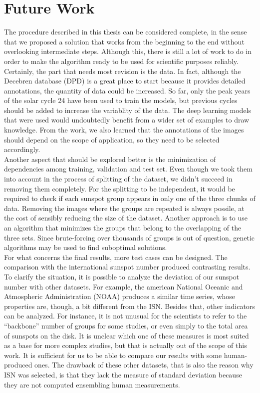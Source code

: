 \section{Future Work}
The procedure described in this thesis can be considered complete, in the sense that we proposed a solution that works from the beginning to the end without overlooking intermediate steps. Although this, there is still a lot of work to do in order to make the algorithm ready to be used for scientific purposes reliably.\\
Certainly, the part that needs most revision is the data. In fact, although the Decebren database (DPD) is a great place to start because it provides detailed annotations, the quantity of data could be increased. So far, only the peak years of the solar cycle 24 have been used to train the models, but previous cycles should be added to increase the variablity of the data. The deep learning models that were used would undoubtedly benefit from a wider set of examples to draw knowledge. From the work, we also learned that the annotations of the images should depend on the scope of application, so they need to be selected accordingly.\\
Another aspect that should be explored better is the minimization of dependencies among training, validation and test set. Even though we took them into account in the process of splitting of the dataset, we didn't succeed in removing them completely. For the splitting to be independent, it would be required to check if each sunspot group appears in only one of the three chunks of data. Removing the images where the groups are repeated is always possile, at the cost of sensibly reducing the size of the dataset. Another approach is to use an algorithm that minimizes the groups that belong to the overlapping of the three sets. Since brute-forcing over thousands of groups is out of question, genetic algorithms may be used to find suboptimal solutions.\\
For what concerns the final results, more test cases can be designed. The comparison with the international sunspot number produced contrasting results. To clarify the situation, it is possible to analyze the deviation of our sunspot number with other datasets. For example, the american National Oceanic and Atmospheric Administration (NOAA) produces a similar time series, whose properties are, though, a bit different from the ISN. Besides that, other indicators can be analyzed. For instance, it is not unusual for the scientists to refer to the ``backbone'' number of groups for some studies, or even simply to the total area of sunspots on the disk. It is unclear which one of these measures is most suited as a base for more complex studies, but that is actually out of the scope of this work. It is sufficient for us to be able to compare our results with some human-produced ones. The drawback of these other datasets, that is also the reason why ISN was selected, is that they lack the measure of standard deviation because they are not computed ensembling human measurements.\\
